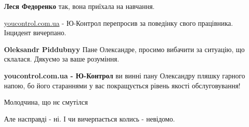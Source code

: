 \begin{itemize}
\begin{itemize}
 
\textbf{Леся Федоренко} так, вона приїхала на навчання.
\end{itemize}

 
\url{youcontrol.com.ua} - Ю-Контрол перепросив за поведінку свого працівника. Інцидент вичерпано.

\begin{itemize}
 
\textbf{Oleksandr Piddubnyy} Пане Олександре, просимо вибачити за ситуацію, що склалася. Дякуємо за ваше розуміння.

 
\textbf{youcontrol.com.ua - Ю-Контрол} ви винні пану Олександру пляшку гарного
напою, бо його стараннями у вас покращується рівень якості обслуговування!
\end{itemize}

 
Молодчина, що нє смутілся

 
Але насправді - ні. І чи вичерпається колись - невідомо.

\end{itemize}

